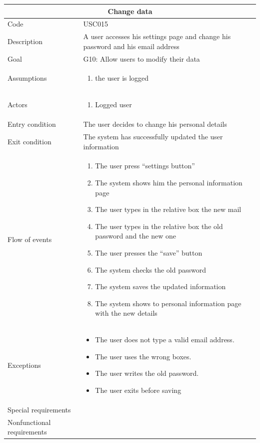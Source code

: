 \documentclass[10pt,a4paper,titlepage]{article}
\begin{document}
\begin{tabular}[h]{| p{3cm} | p{10cm} |} 
\hline \multicolumn{2}{|c|}{\textbf{Change data}} \\  
\hline Code & USC015 \\  
\hline Description & A user accesses his settings page and change his password and his email address\\ 
\hline Goal & G10: Allow users to modify their data\\ 
\hline Assumptions  & \begin{enumerate} 
\item the user is logged
\end{enumerate} \\ 
\hline Actors &  \begin{enumerate} 
\item Logged user
\end{enumerate} \\ 
\hline Entry condition & The user decides to change his personal details\\ 
\hline Exit condition & The system has successfully updated the user information\\ 
\hline Flow of events & \begin{enumerate} 
\item The user press “settings button”
\item The system shows him the personal information page
\item The user types in the relative box the new mail
\item The user types in the relative box the old password and the new one
\item The user presses the “save” button
\item The system checks the old password
\item The system saves the updated information
\item The system shows to personal information page with the new details 
\end{enumerate}\\ 
\hline Exceptions & \begin{itemize}
\item The user does not type a valid email address.
\item The user uses the wrong boxes.
\item The user writes the old password.
\item The user exits before saving
\end{itemize}\\ 
\hline Special requirements &\\ 
\hline Nonfunctional requirements &\\ 
\hline 
\end{tabular} 
\end{document}
